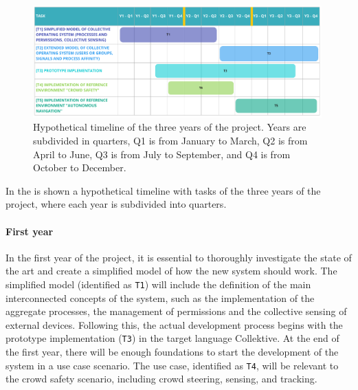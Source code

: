 \documentclass[12pt, a4paper]{article}
\begin{document}
\begin{figure}
    \centering
    \includegraphics[width=0.99\textwidth]{figures/timeline}
    \caption{Hypothetical timeline of the three years of the project.
        Years are subdivided in quarters, Q1 is from January to March,
        Q2 is from April to June, Q3 is from July to September, and Q4 is from October to December.
    }\label{fig:timeline}
\end{figure}

In the  is shown a hypothetical timeline with tasks of the three years of the project,
where each year is subdivided into quarters.

\sloppypar
\paragraph{First year}
In the first year of the project,
it is essential to thoroughly investigate the state of the art and create a simplified model of how the new system should work.
%
The simplified model (identified as \texttt{T1})
will include the definition of the main interconnected concepts of the system,
such as the implementation of the aggregate processes,
the management of permissions and the collective sensing of external devices.
%
Following this,
the actual development process begins with the prototype implementation (\texttt{T3}) in the target language Collektive.
%
At the end of the first year,
there will be enough foundations to start the development of the system in a use case scenario.
%
The use case, identified as \texttt{T4},
will be relevant to the crowd safety scenario,
including crowd steering, sensing, and tracking.

\sloppypar
\end{document}
